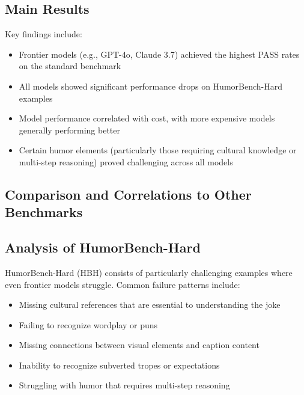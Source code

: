 \documentclass[twocolumn]{article}
\begin{document}

\subsection{Main Results}


Key findings include:
\begin{itemize}
    \item Frontier models (e.g., GPT-4o, Claude 3.7) achieved the highest PASS rates on the standard benchmark
    \item All models showed significant performance drops on HumorBench-Hard examples
    \item Model performance correlated with cost, with more expensive models generally performing better
    \item Certain humor elements (particularly those requiring cultural knowledge or multi-step reasoning) proved challenging across all models
\end{itemize}

\subsection{Comparison and Correlations to Other Benchmarks}


\subsection{Analysis of HumorBench-Hard}

HumorBench-Hard (HBH) consists of particularly challenging examples where even frontier models struggle. Common failure patterns include:

\begin{itemize}
    \item Missing cultural references that are essential to understanding the joke
    \item Failing to recognize wordplay or puns
    \item Missing connections between visual elements and caption content
    \item Inability to recognize subverted tropes or expectations
    \item Struggling with humor that requires multi-step reasoning
\end{itemize}
\end{document}
